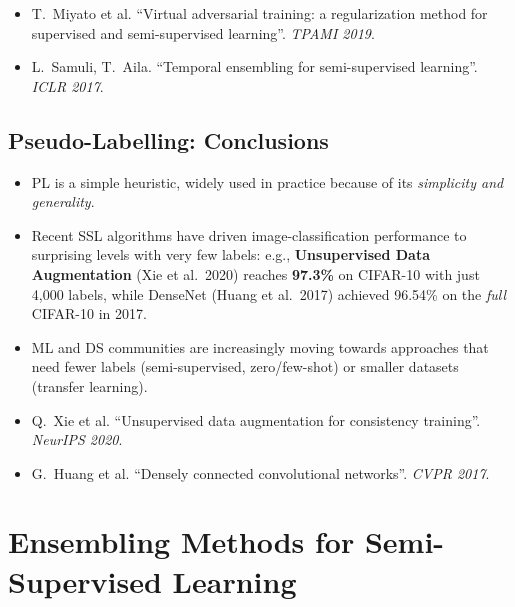\documentclass[11pt,a4paper]{article}
\theoremstyle{definition}
\theoremstyle{plain}
\theoremstyle{remark}
\begin{document}
\begin{tcolorbox}[colback=blue!5!white,colframe=blue!60!black,title={References}]
\begin{itemize}[leftmargin=*]
    \item T.\ Miyato et al. ``Virtual adversarial training: a regularization method for supervised and semi-supervised learning''. \textit{TPAMI 2019}.
    \item L.\ Samuli, T.\ Aila. ``Temporal ensembling for semi-supervised learning''. \textit{ICLR 2017}.
\end{itemize}
\end{tcolorbox}

\subsection{Pseudo-Labelling: Conclusions}

\begin{itemize}
    \item PL is a simple heuristic, widely used in practice because of its \emph{simplicity and generality}.
    \item Recent SSL algorithms have driven image-classification performance to surprising levels with very few labels: e.g., \textbf{Unsupervised Data Augmentation} (Xie et al.\ 2020) reaches \textbf{97.3\%} on CIFAR-10 with just 4{,}000 labels, while DenseNet (Huang et al.\ 2017) achieved 96.54\% on the \emph{full} CIFAR-10 in 2017.
    \item ML and DS communities are increasingly moving towards approaches that need fewer labels (semi-supervised, zero/few-shot) or smaller datasets (transfer learning).
\end{itemize}

\begin{tcolorbox}[colback=blue!5!white,colframe=blue!60!black,title={References}]
\begin{itemize}[leftmargin=*]
    \item Q.\ Xie et al. ``Unsupervised data augmentation for consistency training''. \textit{NeurIPS 2020}.
    \item G.\ Huang et al. ``Densely connected convolutional networks''. \textit{CVPR 2017}.
\end{itemize}
\end{tcolorbox}


\section{Ensembling Methods for Semi-Supervised Learning}
\end{document}
